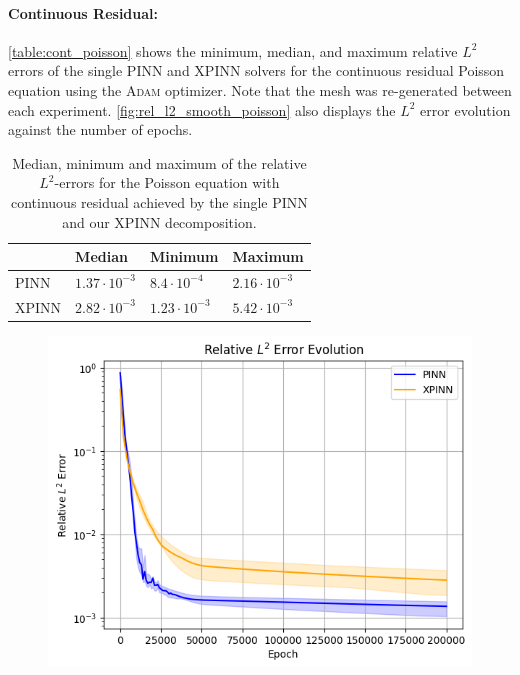 \paragraph{Continuous Residual:}
\autoref{table:cont_poisson} shows the minimum, median, and maximum relative $L^2$ errors of the single PINN and XPINN solvers for the continuous residual Poisson equation using the \textsc{Adam} optimizer. Note that the mesh was re-generated between each experiment. \autoref{fig:rel_l2_smooth_poisson} also displays the $L^2$ error evolution against the number of epochs.
\begin{table}[h]
\caption{Median, minimum and maximum of the relative $L^2$-errors for the Poisson equation with continuous residual achieved by the single PINN and our XPINN decomposition. }
    \centering
    \begin{tabular}{|l|l l l|}
    \hline
     & Median & Minimum & Maximum
    \\
    \hline
    PINN &$1.37\cdot 10^{-3}$ &  $8.4 \cdot 10^{-4}$&$2.16 \cdot 10^{-3}$ 
    \\
    XPINN &$2.82\cdot 10^{-3}$ &  $1.23 \cdot 10^{-3}$&$5.42 \cdot 10^{-3}$
    \\
    \hline
    \end{tabular}
    \label{table:cont_poisson}
\end{table}
\begin{figure}[h]
    \centering
    \includegraphics[width = \linewidth]{Project1XPINNs/figures/Poisson/Relative_L2_smooth_Adam.png}
    \caption{}
    \label{fig:rel_l2_smooth_poisson}
\end{figure}


